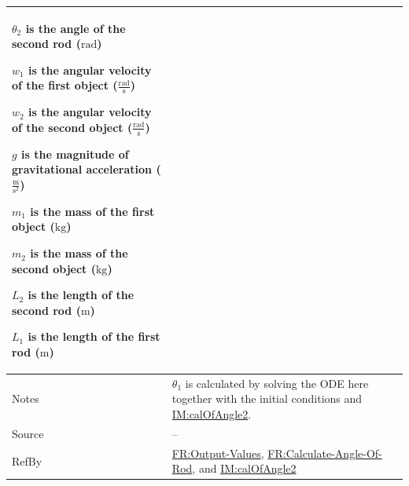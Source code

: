 \documentclass[12pt]{article}
\begin{document}
\begin{minipage}{\textwidth}
\begin{tabular}{>{\raggedright}p{}>{\raggedright\arraybackslash}p{}}
\begin{symbDescription}
              \item{${θ_{2}}$ is the angle of the second rod (${\text{rad}}$)}
              \item{${w_{1}}$ is the angular velocity of the first object ($\frac{\text{rad}}{\text{s}}$)}
              \item{${w_{2}}$ is the angular velocity of the second object ($\frac{\text{rad}}{\text{s}}$)}
              \item{$g$ is the magnitude of gravitational acceleration ($\frac{\text{m}}{\text{s}^{2}}$)}
              \item{${m_{1}}$ is the mass of the first object (${\text{kg}}$)}
              \item{${m_{2}}$ is the mass of the second object (${\text{kg}}$)}
              \item{${L_{2}}$ is the length of the second rod (${\text{m}}$)}
              \item{${L_{1}}$ is the length of the first rod (${\text{m}}$)}
              \end{symbDescription}
\\ \midrule
Notes & ${θ_{1}}$ is calculated by solving the ODE here together with the initial conditions and \hyperref[IM:calOfAngle2]{IM:calOfAngle2}.
        
\\ \midrule
Source & --
         
\\ \midrule
RefBy & \hyperref[outputValues]{FR:Output-Values}, \hyperref[calcAng]{FR:Calculate-Angle-Of-Rod}, and \hyperref[IM:calOfAngle2]{IM:calOfAngle2}
        
\\ \bottomrule
\end{tabular}
\end{minipage}
\vspace{\baselineskip}
\noindent
\end{document}
